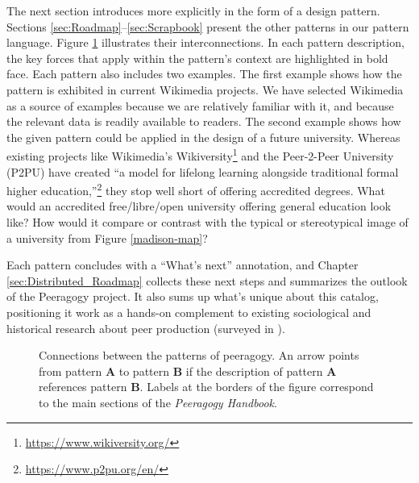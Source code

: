 \begin{refsection}
The next section introduces  more explicitly in the form of a design pattern.  Sections \ref{sec:Roadmap}--\ref{sec:Scrapbook} present the other patterns in our pattern language.  Figure \ref{fig:connections} illustrates their interconnections.  In each pattern description, the key forces that apply within the pattern's context are highlighted in bold face.  Each pattern also includes two examples.  The first example shows how the pattern is exhibited in current Wikimedia projects.  We have selected Wikimedia as a source of examples because we are relatively familiar with it, and because the relevant data is readily available to readers.  The second example shows how the given pattern could be applied in the design of a future university.  Whereas existing projects like Wikimedia's Wikiversity\footnote{\url{https://www.wikiversity.org/}} and the Peer-2-Peer University (P2PU) have created ``a model for lifelong learning alongside traditional formal higher education,''\footnote{\url{https://www.p2pu.org/en/}} they stop well short of offering accredited degrees.  What would an accredited free/libre/open university offering general education look like?  How would it compare or contrast with the typical or stereotypical image of a university from Figure \ref{madison-map}?

Each pattern concludes with a ``What's next'' annotation, and Chapter \ref{sec:Distributed_Roadmap} collects these next steps and summarizes the outlook of the Peeragogy project.  It also
sums up what's unique about this catalog, positioning it work as a hands-on complement to existing sociological and historical research about peer production (surveyed in \cite{benkler2015peer}).

\begin{figure}
{\centering


\par
}
\caption{Connections between the patterns of peeragogy.  An arrow points from pattern \textbf{A} to pattern \textbf{B} if the description of pattern \textbf{A} references pattern \textbf{B}. Labels at the borders of the figure correspond to the main sections of the \emph{Peeragogy Handbook}.\label{fig:connections}}
\end{figure}


\end{refsection}
